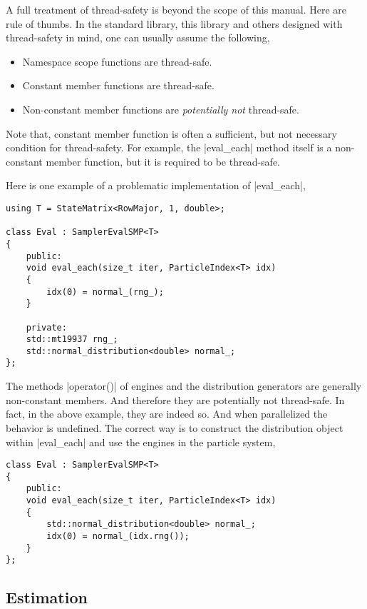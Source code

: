 A full treatment of thread-safety is beyond the scope of this manual. Here are
rule of thumbs. In the standard library, this library and others designed with
thread-safety in mind, one can usually assume the following,
\begin{itemize}
  \item Namespace scope functions are thread-safe.
  \item Constant member functions are thread-safe.
  \item Non-constant member functions are \emph{potentially not} thread-safe.
\end{itemize}
Note that, constant member function is often a sufficient, but not necessary
condition for thread-safety. For example, the |eval_each| method itself is a
non-constant member function, but it is required to be thread-safe.

Here is one example of a problematic implementation of |eval_each|,
\begin{Verbatim}
using T = StateMatrix<RowMajor, 1, double>;

class Eval : SamplerEvalSMP<T>
{
    public:
    void eval_each(size_t iter, ParticleIndex<T> idx)
    {
        idx(0) = normal_(rng_);
    }

    private:
    std::mt19937 rng_;
    std::normal_distribution<double> normal_;
};
\end{Verbatim}
The methods |operator()| of \rng engines and the distribution generators are
generally non-constant members. And therefore they are potentially not
thread-safe. In fact, in the above example, they are indeed so. And when
parallelized the behavior is undefined. The correct way is to construct the
distribution object within |eval_each| and use the \rng engines in the particle
system,
\begin{Verbatim}
class Eval : SamplerEvalSMP<T>
{
    public:
    void eval_each(size_t iter, ParticleIndex<T> idx)
    {
        std::normal_distribution<double> normal_;
        idx(0) = normal_(idx.rng());
    }
};
\end{Verbatim}

\subsection{Estimation}
\label{sub:Estimation}

